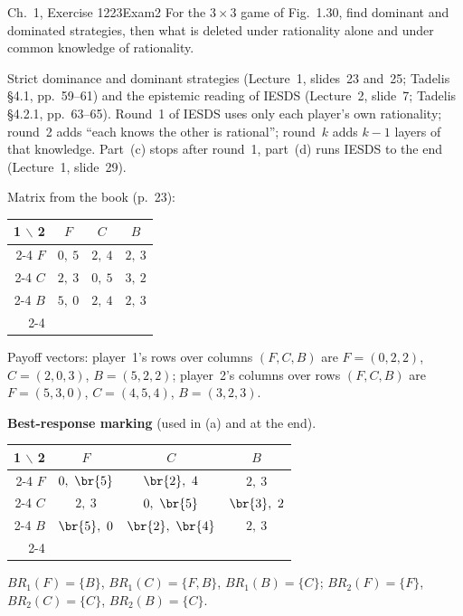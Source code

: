 \begin{exsol}{\MG{} Ch.~1, Exercise 12}{23}{Exam}{2}
\asked For the $3\times3$ game of Fig.~1.30, find dominant and dominated strategies, then what is
deleted under rationality alone and under common knowledge of rationality.

\method Strict dominance and dominant strategies (Lecture~1, slides~23 and~25; Tadelis \S4.1,
pp.~59--61) and the epistemic reading of IESDS (Lecture~2, slide~7;
Tadelis \S4.2.1, pp.~63--65). Round~1 of IESDS uses only each player's own rationality; round~2
adds ``each knows the other is rational''; round~$k$ adds $k-1$ layers of that knowledge. Part~(c)
stops after round~1, part~(d) runs IESDS to the end (Lecture~1, slide~29).

\solution
Matrix from the book (p.~23):
\begin{center}
\begin{tabular}{r|c|c|c|}
\multicolumn{1}{r}{1 $\backslash$ 2} & \multicolumn{1}{c}{$F$} & \multicolumn{1}{c}{$C$} & \multicolumn{1}{c}{$B$}\\ \cline{2-4}
$F$ & $0,\ 5$ & $2,\ 4$ & $2,\ 3$ \\ \cline{2-4}
$C$ & $2,\ 3$ & $0,\ 5$ & $3,\ 2$ \\ \cline{2-4}
$B$ & $5,\ 0$ & $2,\ 4$ & $2,\ 3$ \\ \cline{2-4}
\end{tabular}
\end{center}
Payoff vectors: player~1's rows over columns $(F,C,B)$ are $F = (0,2,2)$, $C = (2,0,3)$,
$B = (5,2,2)$; player~2's columns over rows $(F,C,B)$ are $F = (5,3,0)$, $C = (4,5,4)$,
$B = (3,2,3)$.

\textbf{Best-response marking} (used in (a) and at the end).
\begin{center}
\begin{tabular}{r|c|c|c|}
\multicolumn{1}{r}{1 $\backslash$ 2} & \multicolumn{1}{c}{$F$} & \multicolumn{1}{c}{$C$} & \multicolumn{1}{c}{$B$}\\ \cline{2-4}
$F$ & $0,\ \br{5}$ & $\br{2},\ 4$ & $2,\ 3$ \\ \cline{2-4}
$C$ & $2,\ 3$ & $0,\ \br{5}$ & $\br{3},\ 2$ \\ \cline{2-4}
$B$ & $\br{5},\ 0$ & $\br{2},\ \br{4}$ & $2,\ 3$ \\ \cline{2-4}
\end{tabular}
\end{center}
$BR_1(F) = \{B\}$, $BR_1(C) = \{F, B\}$, $BR_1(B) = \{C\}$; $BR_2(F) = \{F\}$, $BR_2(C) = \{C\}$,
$BR_2(B) = \{C\}$.


\end{exsol}
